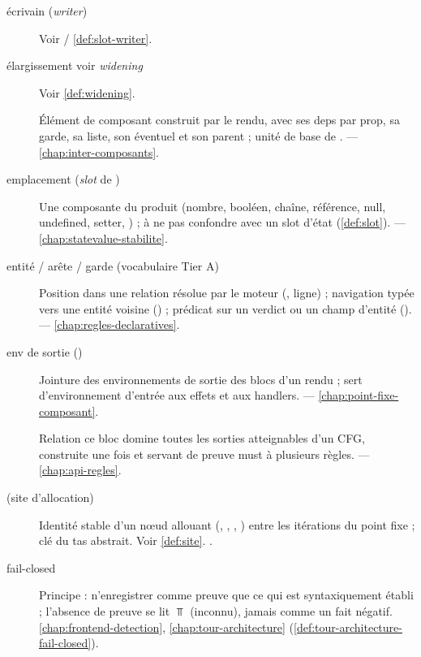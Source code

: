 \begin{description}
\item[écrivain (\emph{writer})] Voir  / \cref{def:slot-writer}.

\item[élargissement voir \emph{widening}] Voir \cref{def:widening}.

\item[] Élément de composant construit par le rendu, avec ses deps par prop, sa garde, sa liste, son éventuel  et son parent ; unité de base de .  — \cref{chap:inter-composants}.

\item[emplacement (\emph{slot} de )] Une composante du produit  (nombre, booléen, chaîne, référence, null, undefined, setter, ) ; à ne pas confondre avec un slot d'état (\cref{def:slot}).  — \cref{chap:statevalue-stabilite}.

\item[entité / arête / garde (vocabulaire Tier A)] Position dans une relation résolue par le moteur (, ligne) ; navigation typée vers une entité voisine () ; prédicat sur un verdict ou un champ d'entité ().  — \cref{chap:regles-declaratives}.

\item[env de sortie ()] Jointure des environnements de sortie des blocs  d'un rendu ; sert d'environnement d'entrée aux effets et aux handlers.  — \cref{chap:point-fixe-composant}.

\item[] Relation \og ce bloc domine toutes les sorties  atteignables\fg{} d'un CFG, construite une fois et servant de preuve must à plusieurs règles.  — \cref{chap:api-regles}.

\item[ (site d'allocation)] Identité stable d'un nœud allouant (, , , ) entre les itérations du point fixe ; clé du tas abstrait. Voir \cref{def:site}. .

\item[fail-closed] Principe : n'enregistrer comme preuve que ce qui est syntaxiquement établi ; l'absence de preuve se lit \(\Top\) (inconnu), jamais comme un fait négatif. \cref{chap:frontend-detection}, \cref{chap:tour-architecture} (\cref{def:tour-architecture-fail-closed}).


\end{description}

